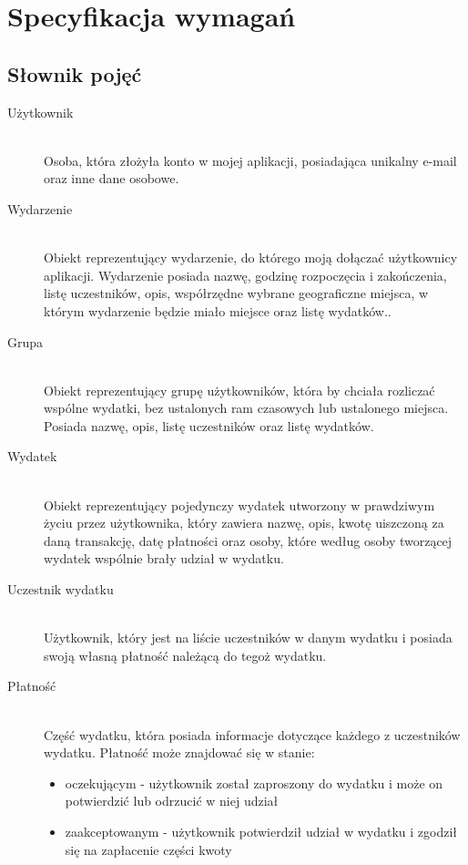 \newpage %

\section{Specyfikacja wymagań}
\subsection{Słownik pojęć}
\begin{description}
  \item[Użytkownik] \hfill \\ Osoba, która złożyła konto w mojej aplikacji, posiadająca unikalny e-mail oraz inne dane osobowe.
  \item[Wydarzenie] \hfill \\ Obiekt reprezentujący wydarzenie, do którego moją dołączać użytkownicy aplikacji. Wydarzenie posiada nazwę, godzinę rozpoczęcia i zakończenia, listę uczestników, opis, współrzędne wybrane geograficzne miejsca, w którym wydarzenie będzie miało miejsce oraz listę wydatków..
  \item[Grupa] \hfill \\ Obiekt reprezentujący grupę użytkowników, która by chciała rozliczać wspólne wydatki, bez ustalonych ram czasowych lub ustalonego miejsca. Posiada nazwę, opis, listę uczestników oraz listę wydatków.
  \item[Wydatek] \hfill \\ Obiekt reprezentujący pojedynczy wydatek utworzony w prawdziwym życiu przez użytkownika, który zawiera nazwę, opis, kwotę uiszczoną za daną transakcję, datę płatności oraz osoby, które według osoby tworzącej wydatek wspólnie brały udział w wydatku.
  \item[Uczestnik wydatku] \hfill \\ Użytkownik, który jest na liście uczestników w danym wydatku i posiada swoją własną płatność należącą do tegoż wydatku.
  \item[Płatność] \hfill \\ Część wydatku, która posiada informacje dotyczące każdego z uczestników wydatku. Płatność może znajdować się w stanie:
    \begin{itemize}
    \item oczekującym - użytkownik został zaproszony do wydatku i może on potwierdzić lub odrzucić w niej udział 
    \item zaakceptowanym - użytkownik potwierdził udział w wydatku i zgodził się na zapłacenie części kwoty

\end{itemize}
\end{description}
